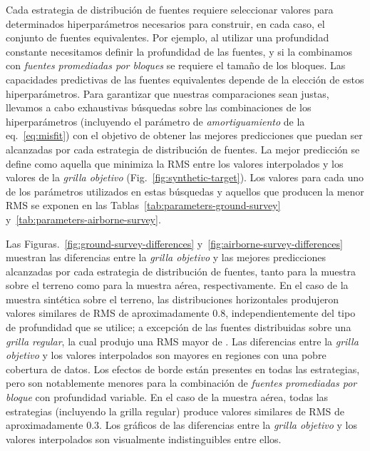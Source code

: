 Cada estrategia de distribución de fuentes requiere seleccionar valores para
determinados hiperparámetros necesarios para construir, en cada caso, el
conjunto de fuentes equivalentes.
Por ejemplo, al utilizar una profundidad constante necesitamos definir la
profundidad de las fuentes, y si la combinamos con \emph{fuentes promediadas
por bloques} se requiere el tamaño de los bloques.
Las capacidades predictivas de las fuentes equivalentes depende de la elección
de estos hiperparámetros.
Para garantizar que nuestras comparaciones sean justas, llevamos a cabo
exhaustivas búsquedas sobre las combinaciones de los hiperparámetros
(incluyendo el parámetro de \emph{amortiguamiento} de la eq.~\ref{eq:misfit})
con el objetivo de obtener las mejores predicciones que puedan ser alcanzadas
por cada estrategia de distribución de fuentes.
La mejor predicción se define como aquella que minimiza la \ac{RMS} entre los
valores interpolados y los valores de la \emph{grilla objetivo}
(Fig.~\ref{fig:synthetic-target}).
Los valores para cada uno de los parámetros utilizados en estas búsquedas
y aquellos que producen la menor \ac{RMS} se exponen en las
Tablas~\ref{tab:parameters-ground-survey}
y~\ref{tab:parameters-airborne-survey}.

Las Figuras.~\ref{fig:ground-survey-differences}
y~\ref{fig:airborne-survey-differences}
muestran las diferencias entre la \emph{grilla objetivo} y las mejores
predicciones alcanzadas por cada estrategia de distribución de fuentes, tanto
para la muestra sobre el terreno como para la muestra aérea, respectivamente.
En el caso de la muestra sintética sobre el terreno, las distribuciones
horizontales produjeron valores similares de \ac{RMS} de aproximadamente
0.8\mGal{}, independientemente del tipo de profundidad que se utilice;
a excepción de las fuentes distribuidas sobre una \emph{grilla regular}, la
cual produjo una \ac{RMS} mayor de
\BestGroundGridSourcesConstantDepthRms{}\mGal{}.
Las diferencias entre la \emph{grilla objetivo} y los valores interpolados son
mayores en regiones con una pobre cobertura de datos.
Los efectos de borde están presentes en todas las estrategias, pero son
notablemente menores para la combinación de \emph{fuentes promediadas por
bloque} con profundidad variable.
En el caso de la muestra aérea, todas las estrategias (incluyendo la grilla
regular) produce valores similares de \ac{RMS} de aproximadamente 0.3\mGal{}.
Los gráficos de las diferencias entre la \emph{grilla objetivo} y los valores
interpolados son visualmente indistinguibles entre ellos.

